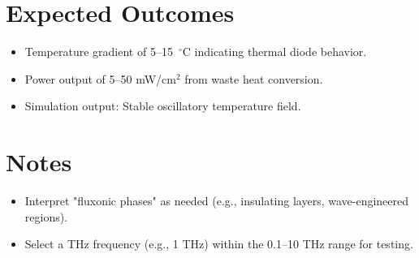 \documentclass[a4paper,12pt]{article}
\begin{document}
\section{Expected Outcomes}
\begin{itemize}
    \item Temperature gradient of 5--15~$^\circ$C indicating thermal diode behavior.
    \item Power output of 5--50 mW/cm$^2$ from waste heat conversion.
    \item Simulation output: Stable oscillatory temperature field.
\end{itemize}

\section{Notes}
\begin{itemize}
    \item Interpret "fluxonic phases" as needed (e.g., insulating layers, wave-engineered regions).
    \item Select a THz frequency (e.g., 1 THz) within the 0.1--10 THz range for testing.
\end{itemize}
\end{document}
